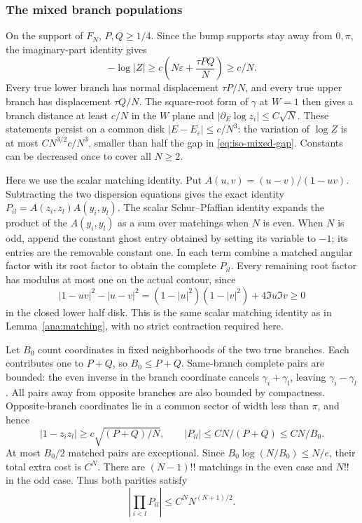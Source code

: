 \documentclass[11pt]{article}
\numberwithin{equation}{section}
\theoremstyle{definition}
\newcommand{\eps}{\varepsilon}
\begin{document}
\subsubsection{The mixed branch populations}

On the support of $F_N$, $P,Q\ge1/4$.  Since the bump supports stay
away from $0,\pi$, the imaginary-part identity gives
\begin{equation}\label{eq:iso-mixed-gap}
 -\log|Z|\ge c\left(N\eps+\frac{\tau PQ}{N}\right)\ge c/N.
\end{equation}
Every true lower branch has normal displacement $\tau P/N$, and every
true upper branch has displacement $\tau Q/N$.  The square-root form
of $\gamma$ at $W=1$ then gives a branch distance at least $c/N$ in
the $W$ plane and $|\partial_{{E}}\log z_i|\le C\sqrt N$.
These statements persist on a common disk
$|{E}-{E}_\eps|\le c/N^3$: the variation of $\log Z$
is at most $CN^{3/2}c/N^3$, smaller than half the gap in
\eqref{eq:iso-mixed-gap}.  Constants can be decreased once to cover
all $N\ge2$.

Here we use the scalar matching identity.
Put $A(u,v)=(u-v)/(1-uv)$.  Subtracting the two dispersion equations
gives the exact identity $P_{il}=A(z_i,z_l)A(y_i,y_l)$.
The scalar Schur--Pfaffian identity expands the product of the
$A(y_i,y_l)$ as a sum over matchings when $N$ is even.  When $N$ is
odd, append the constant ghost entry obtained by setting its variable
to $-1$; its entries are the removable constant one.  In each term
combine a matched angular factor with its root factor to obtain the
complete $P_{il}$.  Every remaining root factor has modulus at most
one on the actual contour, since
\begin{equation}\label{eq:iso-halfdisk-identity}
 |1-uv|^2-|u-v|^2
   =(1-|u|^2)(1-|v|^2)+4\Im u\Im v\ge0
\end{equation}
in the closed lower half disk.  This is the same scalar matching
identity as in Lemma~\ref{ana:matching}, with no strict contraction
required here.

Let $B_0$ count coordinates in fixed neighborhoods of the two true
branches.  Each contributes one to $P+Q$, so $B_0\le P+Q$.
Same-branch complete pairs are bounded: the even inverse in the
branch coordinate cancels $\gamma_i+\gamma_l$, leaving
$\gamma_i-\gamma_l$.  All pairs away from opposite branches are also
bounded by compactness.  Opposite-branch coordinates lie in a common
sector of width less than $\pi$, and hence
\[
 |1-z_i z_l|\ge c\sqrt{(P+Q)/N},\qquad
 |P_{il}|\le CN/(P+Q)\le CN/B_0.
\]
At most $B_0/2$ matched pairs are exceptional.  Since
$B_0\log(N/B_0)\le N/e$, their total extra cost is $C^N$.
There are $(N-1)!!$ matchings in the even case and $N!!$ in the odd
case.  Thus both parities satisfy
\begin{equation}\label{eq:iso-mixed-pairs}
 \left|\prod_{i<l}P_{il}\right|\le C^N N^{(N+1)/2}.
\end{equation}
\end{document}
